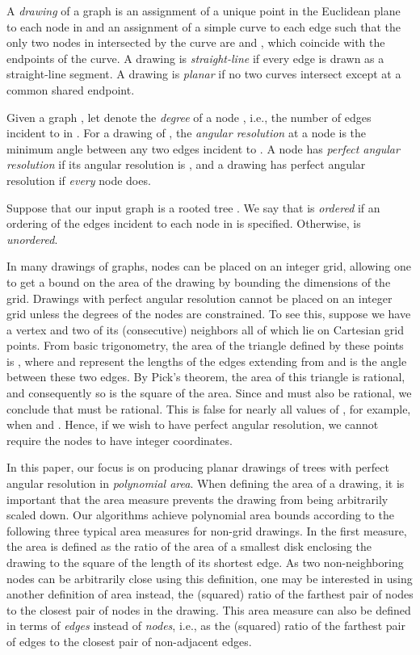 \documentclass[11pt]{article}
\newcommand{\highlight}[1]{{\itshape #1}}
\begin{document}
A \highlight{drawing} of a graph  
is an assignment of a unique point in the Euclidean plane to each node in 
and an assignment of a simple curve to each edge 
such that the only two nodes in  intersected by the curve are  and , which coincide with the endpoints of the curve.
A drawing is \highlight{straight-line} if 
every edge is drawn as a straight-line segment.
A drawing is \highlight{planar} if no two curves intersect 
except at a common shared endpoint.


Given a graph ,
let  denote the
\highlight{degree} 
of a node , i.e., the number of edges incident to  in .
For a drawing of , the \highlight{angular resolution} at a 
node  is the minimum angle between any two edges incident to .
A node has \highlight{perfect angular resolution} 
if its angular resolution is , and
a drawing has perfect angular resolution if {\em every} node does.


Suppose that our input graph  
is a rooted tree .
We say that  is \highlight{ordered} if an ordering of the edges
incident to each node in  is specified. Otherwise,  is 
\highlight{unordered}.

In many drawings of graphs, nodes can be placed on an integer grid,
allowing one to get a bound on the area of the drawing by bounding
the dimensions of the grid.
Drawings with perfect angular resolution
cannot be placed on an integer 
grid unless the degrees of the nodes are constrained.
To see this, suppose we have a vertex  and 
two of its (consecutive) neighbors all of 
which lie on Cartesian grid points.
From basic trigonometry, the area of the triangle defined by 
these points is ,
where  and  represent the lengths of the edges 
extending from  and  is the angle between 
these two edges.
By Pick's theorem, the area of this triangle is rational,
and consequently so is the square of the area.
Since  and  must also be rational, we conclude that
 must be rational.
This is false for nearly all values of ,   for example, when  and .
Hence, if we wish to have perfect angular resolution,
we cannot require the nodes to have integer coordinates.

In this paper, our focus is on producing planar drawings of trees with perfect angular resolution in \emph{polynomial area}.
When defining the area of a drawing, it is important that the area measure prevents the drawing from being arbitrarily scaled down.
Our algorithms achieve polynomial area bounds according to the following three typical area measures for non-grid drawings.
In the first measure, the area is defined as the ratio of the area of a smallest disk enclosing the drawing to the square of the length of its shortest edge.
As two non-neighboring nodes can be arbitrarily close using this definition, one may be interested in using another definition of area instead, the (squared) ratio of the farthest pair of nodes to the closest pair of nodes in the drawing.
This area measure can also be defined in terms of \emph{edges} instead of \emph{nodes}, i.e., as the (squared) ratio of the farthest pair of edges to the closest pair of non-adjacent edges.
\end{document}
